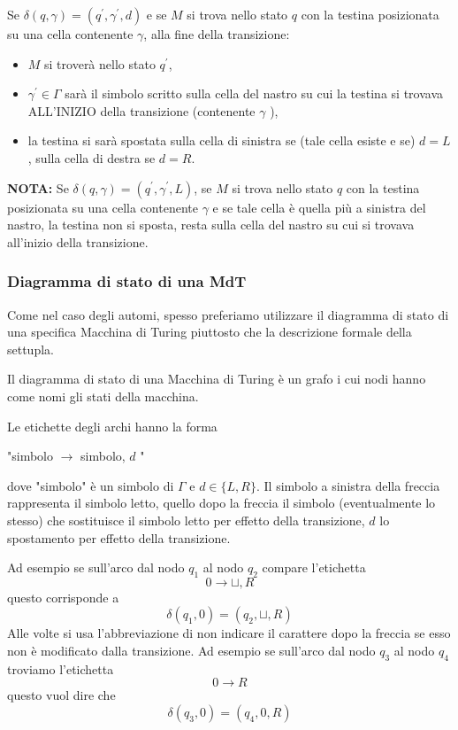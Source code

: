 Se $\delta(q, \gamma)=\left(q^{\prime}, \gamma^{\prime}, d\right)$ e se $M$ si trova nello stato $q$ con la testina posizionata su una cella contenente $\gamma$, alla fine della transizione:
\begin{itemize}
    \item $M$ si troverà nello stato $q^{\prime}$,
    \item $\gamma^{\prime} \in \Gamma$ sarà il simbolo scritto sulla cella del nastro su cui la testina si trovava ALL'INIZIO della transizione (contenente $\gamma$ ),
    \item la testina si sarà spostata sulla cella di sinistra se (tale cella esiste e se) $d=L$, sulla cella di destra se $d=R$.
\end{itemize}
\textbf{NOTA:} Se $\delta(q, \gamma)=\left(q^{\prime}, \gamma^{\prime}, L\right)$, se $M$ si trova nello stato $q$ con la testina posizionata su una cella contenente $\gamma$ e se tale cella è quella più a sinistra del nastro, la testina non si sposta, resta sulla cella del nastro su cui si trovava all'inizio della transizione.

\subsubsection{Diagramma di stato di una MdT}

Come nel caso degli automi, spesso preferiamo utilizzare il diagramma di stato di una specifica Macchina di Turing piuttosto che la descrizione formale della settupla.

Il diagramma di stato di una Macchina di Turing è un grafo i cui nodi hanno come nomi gli stati della macchina.

Le etichette degli archi hanno la forma

"simbolo $\rightarrow$ simbolo, $d$ "


dove "simbolo" è un simbolo di $\Gamma$ e $d \in\{L, R\}$. Il simbolo a sinistra della freccia rappresenta il simbolo letto, quello dopo la freccia il simbolo (eventualmente lo stesso) che sostituisce il simbolo letto per effetto della transizione, $d$ lo spostamento per effetto della transizione.

\vspace{5mm}

Ad esempio se sull'arco dal nodo $q_{1}$ al nodo $q_{2}$ compare l'etichetta
$$
0 \rightarrow \sqcup, R
$$
questo corrisponde a
$$
\delta\left(q_{1}, 0\right)=\left(q_{2}, \sqcup, R\right)
$$
Alle volte si usa l'abbreviazione di non indicare il carattere dopo la freccia se esso non è modificato dalla transizione. Ad esempio se sull'arco dal nodo $q_{3}$ al nodo $q_{4}$ troviamo l'etichetta
$$
0 \rightarrow R
$$
questo vuol dire che
$$
\delta\left(q_{3}, 0\right)=\left(q_{4}, 0, R\right)
$$

